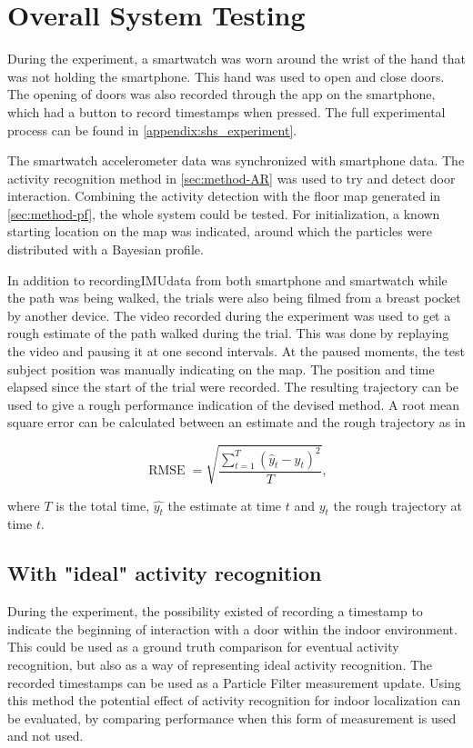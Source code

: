 \section{Overall System Testing}

During the experiment, a smartwatch was worn around the wrist of the hand that was not holding the smartphone. This hand was used to open and close doors. The opening of doors was also recorded through the app on the smartphone, which had a button to record timestamps when pressed. The full experimental process can be found in \cref{appendix:shs_experiment}. \par

The smartwatch accelerometer data was synchronized with smartphone data. The activity recognition method in \cref{sec:method-AR} was used to try and detect door interaction. Combining the activity detection with the floor map generated in \cref{sec:method-pf}, the whole system could be tested. For initialization, a known starting location on the map was indicated, around which the particles were distributed with a Bayesian profile.  \par 

In addition to recording\ac{IMU}data from both smartphone and smartwatch while the path was being walked, the trials were also being filmed from a breast pocket by another device. The video recorded during the experiment was used to get a rough estimate of the path walked during the trial. This was done by replaying the video and pausing it at one second intervals. At the paused moments, the test subject position was manually indicating on the map. The position and time elapsed since the start of the trial were recorded. The resulting trajectory can be used to give a rough performance indication of the devised method. A root mean square error can be calculated between an estimate and the rough trajectory as in

\begin{equation}
	\displaystyle \operatorname {RMSE} ={\sqrt {\frac {\sum _{t=1}^{T}({\hat {y}}_{t}-y_{t})^{2}}{T}}},
	\label{eq:RMSE}
\end{equation}

where $T$ is the total time, $\hat{y_t}$ the estimate at time $t$ and $y_t$ the rough trajectory at time $t$.
\subsection{With "ideal" activity recognition}
During the experiment, the possibility existed of recording a timestamp to indicate the beginning of interaction with a door within the indoor environment. This could be used as a ground truth comparison for eventual activity recognition, but also as a way of representing ideal activity recognition. The recorded timestamps can be used as a Particle Filter measurement update. Using this method the potential effect of activity recognition for indoor localization can be evaluated, by comparing performance when this form of measurement is used and not used. \par 

